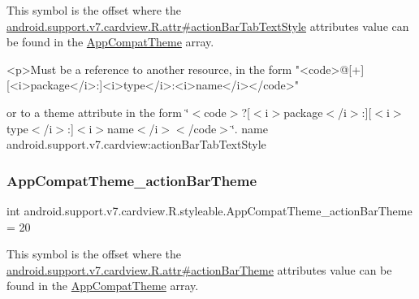 This symbol is the offset where the \hyperlink{classandroid_1_1support_1_1v7_1_1cardview_1_1R_1_1attr_a735d229e3a8a41c55787e41d7db51a85}{android.\+support.\+v7.\+cardview.\+R.\+attr\#action\+Bar\+Tab\+Text\+Style} attribute\textquotesingle{}s value can be found in the \hyperlink{classandroid_1_1support_1_1v7_1_1cardview_1_1R_1_1styleable_a52e6f69f954ecc2622d72c0b4d298938}{App\+Compat\+Theme} array.

\begin{DoxyVerb}      <p>Must be a reference to another resource, in the form "<code>@[+][<i>package</i>:]<i>type</i>:<i>name</i></code>"
\end{DoxyVerb}
 or to a theme attribute in the form \char`\"{}$<$code$>$?\mbox{[}$<$i$>$package$<$/i$>$\+:\mbox{]}\mbox{[}$<$i$>$type$<$/i$>$\+:\mbox{]}$<$i$>$name$<$/i$>$$<$/code$>$\char`\"{}.  name android.\+support.\+v7.\+cardview\+:action\+Bar\+Tab\+Text\+Style \mbox{\label{classandroid_1_1support_1_1v7_1_1cardview_1_1R_1_1styleable_a0afa910c9139ab9dc1ed8bf0bde0fb30}} 
\subsubsection{\texorpdfstring{App\+Compat\+Theme\+\_\+action\+Bar\+Theme}{AppCompatTheme\_actionBarTheme}}
{\footnotesize\ttfamily int android.\+support.\+v7.\+cardview.\+R.\+styleable.\+App\+Compat\+Theme\+\_\+action\+Bar\+Theme = 20\hspace{0.3cm}{\ttfamily [static]}}

This symbol is the offset where the \hyperlink{classandroid_1_1support_1_1v7_1_1cardview_1_1R_1_1attr_a99964711ceb2ce863f537ae400002383}{android.\+support.\+v7.\+cardview.\+R.\+attr\#action\+Bar\+Theme} attribute\textquotesingle{}s value can be found in the \hyperlink{classandroid_1_1support_1_1v7_1_1cardview_1_1R_1_1styleable_a52e6f69f954ecc2622d72c0b4d298938}{App\+Compat\+Theme} array.

